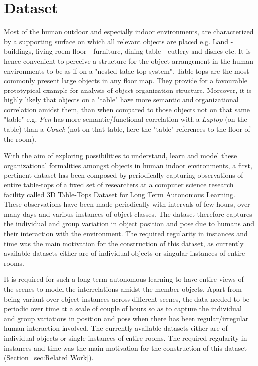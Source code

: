 \documentclass[letterpaper, 10 pt, conference]{ieeeconf}  %
\begin{document}


\section{Dataset}
\label{sec:Dataset}

Most of the human outdoor and especially indoor environments, are characterized by a supporting surface on which all relevant objects are placed e.g. Land - buildings, living room floor - furniture, dining table - cutlery and dishes etc. It is hence convenient to perceive a structure for the object arrangement in the human environments to be as if on a "nested table-top system". Table-tops are the most commonly present large objects in any floor map. They provide for a favourable prototypical example for analysis of object organization structure. Moreover, it is highly likely that objects on a "table" have more semantic and organizational correlation amidst them, than when compared to those objects not on that same "table" e.g. \textit{Pen} has more semantic/functional correlation with a \textit{Laptop} (on the table) than a \textit{Couch} (not on that table, here the "table" references to the floor of the room).

With the aim of exploring possibilities to understand, learn and model these organizational formalities amongst objects in human indoor environments, a first, pertinent dataset has been composed by periodically capturing observations of entire table-tops of a fixed set of researchers at a computer science research facility called 3D Table-Tops Dataset for Long Term Autonomous Learning. These observations have been made periodically with intervals of few hours, over many days and various instances of object classes. The dataset therefore captures the individual and group variation in object position and pose due to humans and their interaction with the environment. The required regularity in instances and time was the main motivation for the construction of this dataset, as currently available datasets either are of individual objects or singular instances of entire rooms.


It is required for such a long-term autonomous learning to have entire views of the scenes to model the interrelations amidst the member objects. Apart from being variant over object instances across different scenes, the data needed to be periodic over time at a scale of couple of hours so as to capture the individual and group variations in position and pose when there has been regular/irregular human interaction involved. The currently available datasets either are of individual objects or single instances of entire rooms. The required regularity in instances and time was the main motivation for the construction of this dataset (Section~\ref{sec:Related Work}).
\end{document}
